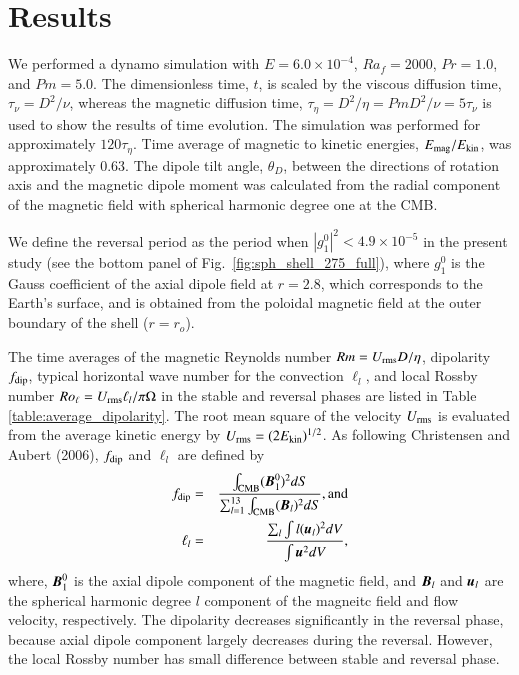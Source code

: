 \section{Results}
\label{section:results}

We performed a dynamo simulation with $E = 6.0 \times 10^{-4}$, $Ra_f = 2000$, $Pr = 1.0$, and $Pm = 5.0$. 
The dimensionless time, $t$, is scaled by the viscous diffusion time, $\tau_\nu = D^2 / \nu$, whereas the magnetic diffusion time, $\tau_\eta = D^2 / \eta = Pm D^2 / \nu = 5 \tau_\nu$ is used to show the results of time evolution.
The simulation was performed for approximately $120 \tau_\eta$. %
Time average of magnetic to kinetic energies, $E_{\rm mag} / E_{\rm kin}$, was approximately 0.63. 
The dipole tilt angle, $\theta_D$, between the directions of rotation axis and the magnetic dipole moment was calculated from the radial component of the magnetic field with spherical harmonic degree one  at the CMB.




{\color{blue}
We define the reversal period as the period when $\left| g_{1}^{0} \right|^2 < 4.9 \times 10^{-5}$ in the present study (see the bottom panel of Fig.~\ref{fig:sph_shell_275_full}), where $g_{1}^{0}$ is the Gauss coefficient of the axial dipole field at $r=2.8$, which corresponds to the Earth’s surface, and is obtained from the poloidal magnetic field at the outer boundary of the shell ($r=r_o$).
%

% 

%
The time averages of the magnetic Reynolds number $Rm = U_{\rm rms} D / \eta$, dipolarity $f_{\rm dip}$, typical horizontal wave number for the convection $\ell_{l}$, and local Rossby number $Ro_{\ell} = U_{\rm rms} \ell_{l} / \pi \Omega $ in the stable and reversal phases are listed in Table \ref{table:average_dipolarity}. The root mean square of the velocity $U_{\rm rms}$ is evaluated from the average kinetic energy by $U_{\rm rms} = (2 E_{\rm kin})^{1/2}$. 
As following Christensen and Aubert (2006), $f_{\rm dip} $ and $\ell_{l}$ are defined by
%
\begin{eqnarray}
f_{\rm dip} &=& \frac{\int_{\rm{CMB}} (\mbox{\boldmath$B$}_{1}^{0})^2 dS}{\sum_{l=1}^{13} \int_{\rm{CMB}} (\mbox{\boldmath$B$}_l)^2 dS}, \mbox{and} \\
\ell_{l} &=& \frac{\sum_{l} \int l(\mbox{\boldmath$u$}_{l})^2 dV}{\int \mbox{\boldmath$u$}^2 dV},
\end{eqnarray}
where, $\mbox{\boldmath$B$}_{1}^{0}$ is the 
{\color{red}axial}
dipole component of the magnetic field, and $\mbox{\boldmath$B$}_{l}$ and $\mbox{\boldmath$u$}_{l}$ are the spherical harmonic degree $l$ component of the magneitc field and flow velocity, respectively.
%
The dipolarity decreases significantly in the reversal phase, because axial dipole component largely decreases during the reversal. However, the local Rossby number has small difference between stable and reversal phase.
}

